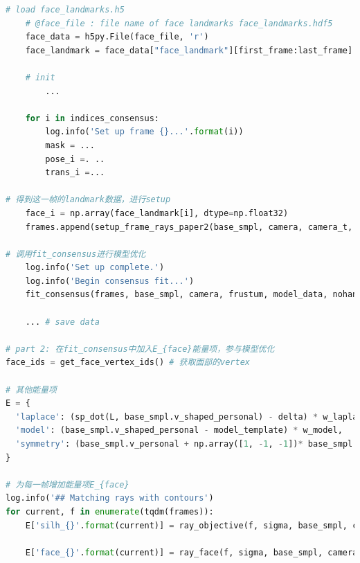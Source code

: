 \documentclass{article}
\begin{document}
\begin{appendices}
\begin{lstlisting}[title=step2\_consencus.py, language=python]
	# load face_landmarks.h5
    # @face_file : file name of face landmarks face_landmarks.hdf5
    face_data = h5py.File(face_file, 'r')
    face_landmark = face_data["face_landmark"][first_frame:last_frame]
    
    # init
        ...
    
    for i in indices_consensus:
       	log.info('Set up frame {}...'.format(i))
		mask = ...
        pose_i =. ..
        trans_i =...

# 得到这一帧的landmark数据，进行setup
	face_i = np.array(face_landmark[i], dtype=np.float32)
	frames.append(setup_frame_rays_paper2(base_smpl, camera, camera_t, camera_rt, pose_i, trans_i, mask, face_i))

# 调用fit_consensus进行模型优化
	log.info('Set up complete.')
	log.info('Begin consensus fit...')
	fit_consensus(frames, base_smpl, camera, frustum, model_data, nohands, icp_count, naked, display)
        
	...	# save data

# part 2: 在fit_consensus中加入E_{face}能量项，参与模型优化
face_ids = get_face_vertex_ids() # 获取面部的vertex
     
# 其他能量项
E = {
  'laplace': (sp_dot(L, base_smpl.v_shaped_personal) - delta) * w_laplace,
  'model': (base_smpl.v_shaped_personal - model_template) * w_model,
  'symmetry': (base_smpl.v_personal + np.array([1, -1, -1])* base_smpl.v_personal[model_data['vert_sym_idxs']]) * w_symmetry,
}

# 为每一帧增加能量项E_{face}
log.info('## Matching rays with contours')
for current, f in enumerate(tqdm(frames)):
	E['silh_{}'.format(current)] = ray_objective(f, sigma, base_smpl, camera, vis_rn_b, vis_rn_m)            

	E['face_{}'.format(current)] = ray_face(f, sigma, base_smpl, camera, face_ids) 

\end{lstlisting}

\end{appendices}
\end{document}
